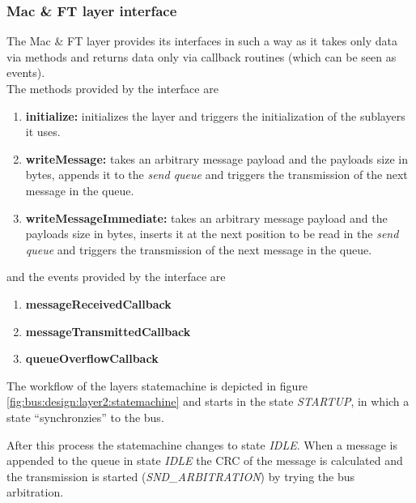 \subsubsection{Mac \& FT layer interface}
\label{sec:bus:design:layer2:interface}

The Mac \& FT layer  provides its interfaces in such a way as it takes only data via methods and returns data only via callback routines (which can be seen as events).\\

The methods provided by the interface are

\begin{enumerate}
 \item \textbf{initialize: } initializes the layer and triggers the initialization of the sublayers it uses.
 \item \textbf{writeMessage: } takes an arbitrary message payload and the payloads size in bytes, appends it to the \textit{send queue} and triggers the transmission of the next message in the queue.
 \item \textbf{writeMessageImmediate: } takes an arbitrary message payload and the payloads size in bytes, inserts it at the next position to be read in the \textit{send queue} and triggers the transmission of the next message in the queue.
\end{enumerate}

and the events provided by the interface are

\begin{enumerate}
 \item \textbf{messageReceivedCallback}
 \item \textbf{messageTransmittedCallback}
 \item \textbf{queueOverflowCallback}
\end{enumerate}










The workflow of the layers statemachine is depicted in figure \ref{fig:bus:design:layer2:statemachine} and starts in the state \textit{STARTUP}, in which a state ``synchronzies'' to the bus.

After this process the statemachine changes to state \textit{IDLE}.
When a message is appended to the queue in state \textit{IDLE} the CRC of the message is calculated and the transmission is started (\textit{SND\_ARBITRATION}) by trying the bus arbitration.\\

